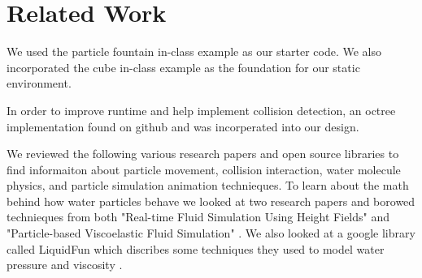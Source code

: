 \section{Related Work}



We used the particle fountain in-class example as our starter code.  We also incorporated the cube in-class example as the foundation for our static environment. \cite{professor}

In order to improve runtime and help implement collision detection, an octree implementation found on github \cite{octree} and \cite{octree2} was incorperated into our design.

We reviewed the following various research papers and open source libraries to find
informaiton about particle movement, collision interaction, water molecule physics, and
particle simulation animation technieques. To learn about the math behind how water
particles behave we looked at two research papers and borowed technieques from both "Real-time Fluid Simulation Using Height Fields" \cite{fluidSim} and "Particle-based Viscoelastic Fluid Simulation"  \cite{viscoelastic}. We also looked at a google library called LiquidFun which discribes some 
techniques they used to model water pressure and viscosity \cite{liquidfun}.
